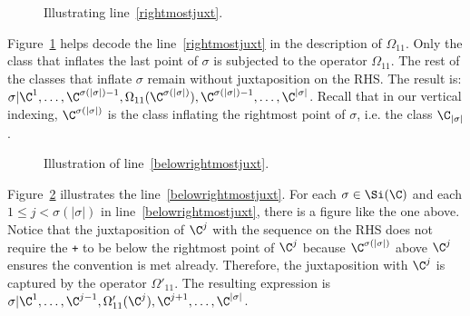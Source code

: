 \begin{figure}[ht]
  \centering
  \caption{Illustrating line~\eqref{rightmostjuxt}.}
  \label{fig:omega11b}
\end{figure}
Figure~\ref{fig:omega11b} helps decode the line~\eqref{rightmostjuxt} in the description of $\Omega_{11}$. Only the class that inflates the last point of $\sigma$ is subjected to the operator $\Omega_{11}$. The rest of the classes that inflate $\sigma$ remain without juxtaposition on the RHS. The result is: $\sigma\vert{\C^1,\ldots,\C^{\sigma(|\sigma|)-1},\Omega_{11}(\C^{\sigma(|\sigma|)}),\C^{\sigma(|\sigma|)-1},\ldots,\C^{|\sigma|}}$. Recall that in our vertical indexing, $\C^{\sigma(|\sigma|)}$ is the class inflating the rightmost point of $\sigma$, i.e. the class $\C_{|\sigma|}$.

\begin{figure}[ht]
  \centering
  \caption{Illustration of line~\eqref{belowrightmostjuxt}.}
  \label{fig:omega11a}
\end{figure}
Figure~\ref{fig:omega11a} illustrates the line~\eqref{belowrightmostjuxt}. For each $\sigma \in \Si(\C)$ and each $1\leq j <\sigma(|\sigma|)$ in line~\eqref{belowrightmostjuxt}, there is a figure like the one above. Notice that the juxtaposition of $\C^j$ with the sequence on the RHS does not require the \texttt{+} to be below the rightmost point of $\C^j$ because $\C^{\sigma(|\sigma|)}$ above $\C^j$ ensures the convention is met already. Therefore, the juxtaposition with $\C^j$ is captured by the operator $\Omega'_{11}$. The resulting expression is $\sigma\vert{\C^{1},\ldots,\C^{j-1},\Omega'_{11}(\C^{j}),\C^{j+1},\ldots,\C^{|\sigma|}}$.


